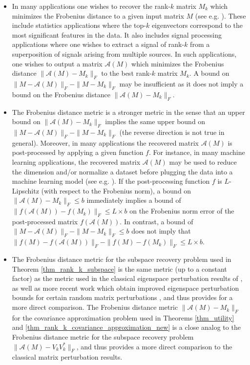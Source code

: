 \documentclass[11pt,letterpaper]{article}
\begin{document}
\begin{itemize}

\item In many applications one wishes to recover the rank-$k$ matrix $M_k$ which minimizes the Frobenius distance to a given input matrix $M$ (see e.g. \cite{davenport2016overview}).
%
These include statistics applications where the top-$k$ eigenvectors correspond to the most significant features in the data.
%
It also includes signal processing applications where one wishes to extract a signal of rank-$k$ from a superposition of signals arising from multiple sources.
%
In such applications, one wishes to output a matrix $\mathcal{A}(M)$ which minimizes the Frobenius distance $\|\mathcal{A}(M) - M_k\|_F$ to the best rank-$k$ matrix $M_k$. 
%
A bound on $\|M-\mathcal{A}(M)\|_F - \|M-M_k\|_F$ may be insufficient as it does not imply a bound on the Frobenius distance $\|\mathcal{A}(M) - M_k\|_F$.


\item The Frobenius distance metric is a stronger metric in the sense that an upper bound on $\|\mathcal{A}(M)- M_k\|_F$ implies the same upper bound on  $\|M-\mathcal{A}(M)\|_F - \|M-M_k\|_F$ (the reverse direction is not true in general).
%
 Moreover, in many applications the recovered matrix $\mathcal{A}(M)$ is post-processed by applying a given function $f$.
%
 For instance, in many machine learning applications, the recovered matrix $\mathcal{A}(M)$ may be used to reduce the dimension and/or normalize a dataset before plugging the data into a machine learning model (see e.g. \cite{james2013introduction}).
 If the post-processing function $f$ is $L$-Lipschitz (with respect to the Frobenius norm), a bound on $\| \mathcal{A}(M) -M_k\|_F \leq b$ immediately implies a bound of $\| f(\mathcal{A}(M)) -f(M_k)\|_F \leq L \times b$ on the Frobenius norm error of the post-processed matrix $f(\mathcal{A}(M))$.
%
 In contrast, a bound of $\|M-\mathcal{A}(M)\|_F - \|M-M_k\|_F \leq b$ does not imply that $\|f(M)-f(\mathcal{A}(M))\|_F - \|f(M)-f(M_k)\|_F \leq L \times b$.

\item The Frobenius distance metric for the subspace recovery problem used in Theorem \ref{thm_rank_k_subspace} is the same metric (up to a constant factor) as the metric used in the classical eigenspace perturbation results of \cite{davis1970rotation}, as well as more recent work which obtain improved eigenspace perturbation bounds for certain random matrix perturbations \cite{o2018random}, and thus provides for a more direct comparison.
%
 The Frobenius distance metric $\|\mathcal{A}(M) -M_k\|_F$ for the covariance approximation problem used in Theorems \ref{thm_utility} and \ref{thm_rank_k_covariance_approximation_new} is a close analog to the Frobenius distance metric for the subspace recovery problem $\|\mathcal{A}(M) -V_k V_k^\ast\|_F$, and thus provides a more direct comparison to the classical matrix perturbation results.

\end{itemize}
\end{document}
